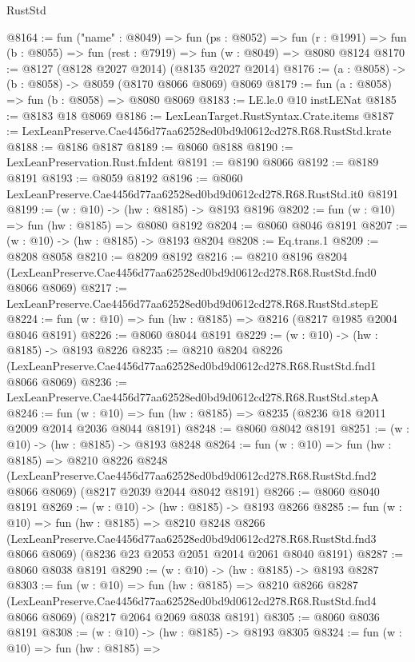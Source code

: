 \begin{lexlean}{RustStd}
\begin{coremodule}
@8164 := fun ("name" : @8049) =>
  fun (ps : @8052) =>
  fun (r : @1991) => fun (b : @8055) => fun (rest : @7919) => fun (w : @8049) => @8080 @8124
@8170 := @8127 (@8128 @2027 @2014) (@8135 @2027 @2014)
@8176 := (a : @8058) -> (b : @8058) -> @8059 (@8170 @8066 @8069) @8069
@8179 := fun (a : @8058) => fun (b : @8058) => @8080 @8069
@8183 := LE.le.{0} @10 instLENat
@8185 := @8183 @18 @8069
@8186 := LexLeanTarget.RustSyntax.Crate.items
@8187 := LexLeanPreserve.Cae4456d77aa62528ed0bd9d0612cd278.R68.RustStd.krate
@8188 := @8186 @8187
@8189 := @8060 @8188
@8190 := LexLeanPreservation.Rust.fnIdent
@8191 := @8190 @8066
@8192 := @8189 @8191
@8193 := @8059 @8192
@8196 := @8060 LexLeanPreserve.Cae4456d77aa62528ed0bd9d0612cd278.R68.RustStd.it0 @8191
@8199 := (w : @10) -> (hw : @8185) -> @8193 @8196
@8202 := fun (w : @10) => fun (hw : @8185) => @8080 @8192
@8204 := @8060 @8046 @8191
@8207 := (w : @10) -> (hw : @8185) -> @8193 @8204
@8208 := Eq.trans.{1}
@8209 := @8208 @8058
@8210 := @8209 @8192
@8216 := @8210
    @8196
    @8204
    (LexLeanPreserve.Cae4456d77aa62528ed0bd9d0612cd278.R68.RustStd.fnd0 @8066 @8069)
@8217 := LexLeanPreserve.Cae4456d77aa62528ed0bd9d0612cd278.R68.RustStd.stepE
@8224 := fun (w : @10) => fun (hw : @8185) => @8216 (@8217 @1985 @2004 @8046 @8191)
@8226 := @8060 @8044 @8191
@8229 := (w : @10) -> (hw : @8185) -> @8193 @8226
@8235 := @8210
    @8204
    @8226
    (LexLeanPreserve.Cae4456d77aa62528ed0bd9d0612cd278.R68.RustStd.fnd1 @8066 @8069)
@8236 := LexLeanPreserve.Cae4456d77aa62528ed0bd9d0612cd278.R68.RustStd.stepA
@8246 := fun (w : @10) => fun (hw : @8185) => @8235 (@8236 @18 @2011 @2009 @2014 @2036 @8044 @8191)
@8248 := @8060 @8042 @8191
@8251 := (w : @10) -> (hw : @8185) -> @8193 @8248
@8264 := fun (w : @10) =>
  fun (hw : @8185) =>
  @8210
    @8226
    @8248
    (LexLeanPreserve.Cae4456d77aa62528ed0bd9d0612cd278.R68.RustStd.fnd2 @8066 @8069)
    (@8217 @2039 @2044 @8042 @8191)
@8266 := @8060 @8040 @8191
@8269 := (w : @10) -> (hw : @8185) -> @8193 @8266
@8285 := fun (w : @10) =>
  fun (hw : @8185) =>
  @8210
    @8248
    @8266
    (LexLeanPreserve.Cae4456d77aa62528ed0bd9d0612cd278.R68.RustStd.fnd3 @8066 @8069)
    (@8236 @23 @2053 @2051 @2014 @2061 @8040 @8191)
@8287 := @8060 @8038 @8191
@8290 := (w : @10) -> (hw : @8185) -> @8193 @8287
@8303 := fun (w : @10) =>
  fun (hw : @8185) =>
  @8210
    @8266
    @8287
    (LexLeanPreserve.Cae4456d77aa62528ed0bd9d0612cd278.R68.RustStd.fnd4 @8066 @8069)
    (@8217 @2064 @2069 @8038 @8191)
@8305 := @8060 @8036 @8191
@8308 := (w : @10) -> (hw : @8185) -> @8193 @8305
@8324 := fun (w : @10) =>
  fun (hw : @8185) =>

\end{coremodule}
\end{lexlean}
